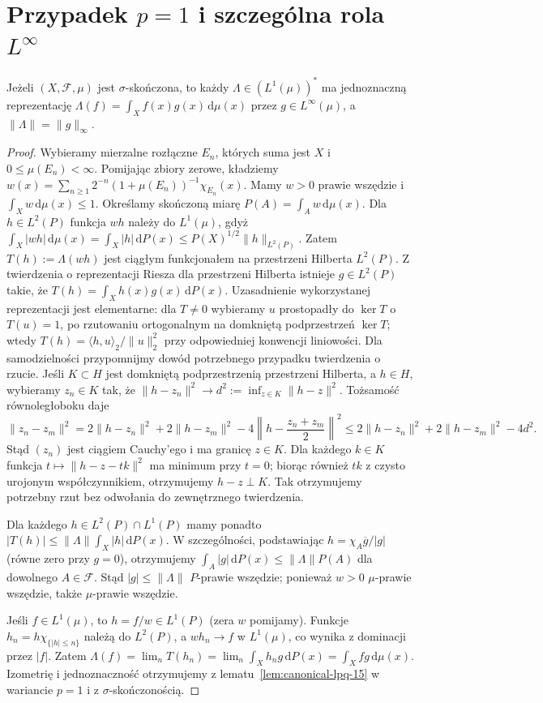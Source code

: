 \section{Przypadek \texorpdfstring{$p=1$}{p = 1} i szczególna rola \texorpdfstring{$L^\infty$}{L\string^∞}}
\begin{twierdzenie}
\label{thm:dual-l1-15}
Jeżeli $(X,\mathcal F,\mu)$ jest $\sigma$-skończona, to
każdy $\Lambda\in(L^1(\mu))^*$ ma jednoznaczną reprezentację
$\Lambda(f)=\int_X f(x)g(x)\,\mathrm d\mu(x)$
przez $g\in L^\infty(\mu)$, a $\|\Lambda\|=\|g\|_\infty$.
\end{twierdzenie}
\begin{proof}
Wybieramy mierzalne rozłączne $E_n$, których suma jest $X$
i $0\le\mu(E_n)<\infty$. Pomijając zbiory zerowe, kładziemy
$w(x)=\sum_{n\ge1}2^{-n}(1+\mu(E_n))^{-1}\chi_{E_n}(x)$.
Mamy $w>0$ prawie wszędzie i $\int_Xw\,\mathrm d\mu(x)\le1$.
Określamy skończoną miarę $P(A)=\int_Aw\,\mathrm d\mu(x)$.
Dla $h\in L^2(P)$ funkcja $wh$ należy do $L^1(\mu)$, gdyż
$\int_X|wh|\,\mathrm d\mu(x)=\int_X|h|\,\mathrm dP(x)
\le P(X)^{1/2}\|h\|_{L^2(P)}$. Zatem
$T(h):=\Lambda(wh)$ jest ciągłym funkcjonałem na
przestrzeni Hilberta $L^2(P)$. Z twierdzenia o reprezentacji
Riesza dla przestrzeni Hilberta istnieje $g\in L^2(P)$
takie, że $T(h)=\int_X h(x)g(x)\,\mathrm dP(x)$.
Uzasadnienie wykorzystanej reprezentacji jest elementarne:
dla $T\ne0$ wybieramy $u$ prostopadły do $\ker T$ o
$T(u)=1$, po rzutowaniu ortogonalnym na domkniętą
podprzestrzeń $\ker T$; wtedy
$T(h)=\langle h,u\rangle_2/\|u\|_2^2$ przy odpowiedniej
konwencji liniowości. Dla samodzielności przypomnijmy dowód potrzebnego
przypadku twierdzenia o rzucie. Jeśli $K\subset H$ jest
domkniętą podprzestrzenią przestrzeni Hilberta,
a $h\in H$, wybieramy $z_n\in K$ tak, że
$\|h-z_n\|^2\to d^2:=\inf_{z\in K}\|h-z\|^2$.
Tożsamość równoległoboku daje
\[
\|z_n-z_m\|^2
=2\|h-z_n\|^2+2\|h-z_m\|^2
-4\left\|h-\frac{z_n+z_m}{2}\right\|^2
\le2\|h-z_n\|^2+2\|h-z_m\|^2-4d^2.
\]
Stąd $(z_n)$ jest ciągiem Cauchy'ego i ma granicę
$z\in K$. Dla każdego $k\in K$ funkcja
$t\mapsto\|h-z-tk\|^2$ ma minimum przy $t=0$;
biorąc również $tk$ z czysto urojonym współczynnikiem,
otrzymujemy $h-z\perp K$. Tak otrzymujemy potrzebny rzut
bez odwołania do zewnętrznego twierdzenia.

Dla każdego $h\in L^2(P)\cap L^1(P)$ mamy ponadto
$|T(h)|\le\|\Lambda\|\int_X|h|\,\mathrm dP(x)$.
W szczególności, podstawiając
$h=\chi_A\overline g/|g|$ (równe zero przy $g=0$),
otrzymujemy
$\int_A|g|\,\mathrm dP(x)\le\|\Lambda\|P(A)$
dla dowolnego $A\in\mathcal F$. Stąd
$|g|\le\|\Lambda\|$ $P$-prawie wszędzie; ponieważ
$w>0$ $\mu$-prawie wszędzie, także $\mu$-prawie wszędzie.

Jeśli $f\in L^1(\mu)$, to $h=f/w\in L^1(P)$
(zera $w$ pomijamy). Funkcje
$h_n=h\chi_{\{|h|\le n\}}$ należą do
$L^2(P)$, a $wh_n\to f$ w $L^1(\mu)$, co wynika
z dominacji przez $|f|$. Zatem
$\Lambda(f)=\lim_nT(h_n)=\lim_n\int_Xh_ng\,\mathrm dP(x)
=\int_Xfg\,\mathrm d\mu(x)$.
Izometrię i jednoznaczność otrzymujemy z
lematu~\ref{lem:canonical-lpq-15} w wariancie $p=1$
i z $\sigma$-skończonością.
\end{proof}

